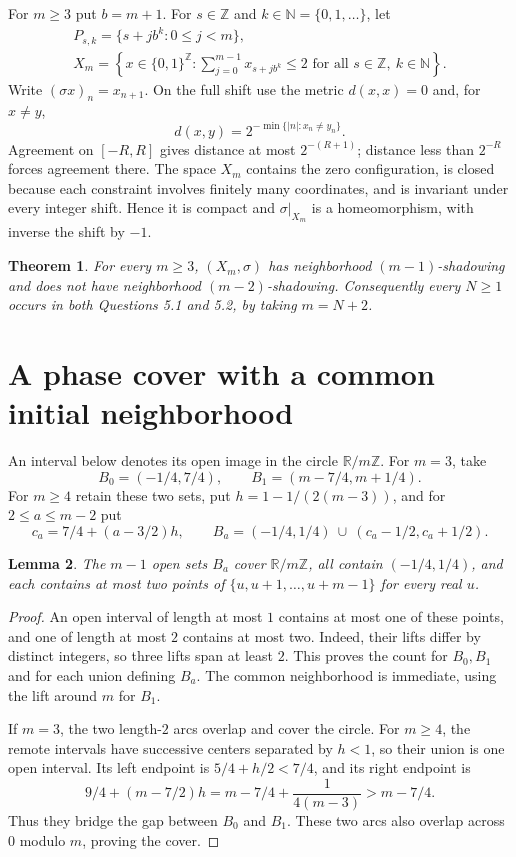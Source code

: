 \documentclass[11pt]{article}
\newtheorem{theorem}{Theorem}
\newtheorem{lemma}[theorem]{Lemma}
\newcommand{\Z}{\mathbb Z}
\newcommand{\N}{\mathbb N}
\begin{document}
For $m\geq3$ put $b=m+1$. For $s\in\Z$ and $k\in\N=\{0,1,\ldots\}$,
let
\[
 \begin{gathered}
 P_{s,k}=\{s+j b^k:0\leq j<m\},\\
 X_m=\left\{x\in\{0,1\}^{\Z}:
       \sum_{j=0}^{m-1}x_{s+j b^k}\leq2
       \text{ for all }s\in\Z,\ k\in\N\right\}.
 \end{gathered}
\]
Write $(\sigma x)_n=x_{n+1}$. On the full shift use the metric
$d(x,x)=0$ and, for $x\ne y$,
\[
 d(x,y)=2^{-\min\{|n|:x_n\ne y_n\}}.
\]
Agreement on $[-R,R]$ gives distance at most $2^{-(R+1)}$;
distance less than $2^{-R}$ forces agreement there.
The space $X_m$ contains the zero configuration, is closed because each
constraint involves finitely many coordinates, and is invariant under
every integer shift. Hence it is compact and $\sigma|_{X_m}$ is a
homeomorphism, with inverse the shift by $-1$.

\begin{theorem}\label{thm:main}
For every $m\geq3$, $(X_m,\sigma)$ has neighborhood $(m-1)$-shadowing
and does not have neighborhood $(m-2)$-shadowing. Consequently every
$N\geq1$ occurs in both Questions 5.1 and 5.2, by taking $m=N+2$.
\end{theorem}

\section{A phase cover with a common initial neighborhood}
An interval below denotes its open image in the circle $\mathbb R/m\Z$.
For $m=3$, take
\[
 B_0=(-1/4,7/4),\qquad B_1=(m-7/4,m+1/4).
\]
For $m\geq4$ retain these two sets, put $h=1-1/(2(m-3))$, and for
$2\leq a\leq m-2$ put
\[
 c_a=7/4+(a-3/2)h,\qquad
 B_a=(-1/4,1/4)\ \cup\ (c_a-1/2,c_a+1/2).
\]

\begin{lemma}\label{lem:circle}
The $m-1$ open sets $B_a$ cover $\mathbb R/m\Z$, all contain
$(-1/4,1/4)$, and each contains at most two points of
$\{u,u+1,\ldots,u+m-1\}$ for every real $u$.
\end{lemma}
\begin{proof}
An open interval of length at most $1$ contains at most one of these
points, and one of length at most $2$ contains at most two. Indeed,
their lifts differ by distinct integers, so three lifts span at least
$2$. This proves the count for $B_0,B_1$ and for each union defining
$B_a$. The common neighborhood is immediate, using the lift around $m$
for $B_1$.

If $m=3$, the two length-$2$ arcs overlap and cover the circle.
For $m\geq4$, the remote intervals have successive centers separated by
$h<1$, so their union is one open interval. Its left endpoint is
$5/4+h/2<7/4$, and its right endpoint is
\[
 9/4+(m-7/2)h=m-7/4+\frac1{4(m-3)}>m-7/4.
\]
Thus they bridge the gap between $B_0$ and $B_1$. These two arcs also
overlap across $0$ modulo $m$, proving the cover.
\end{proof}
\end{document}

